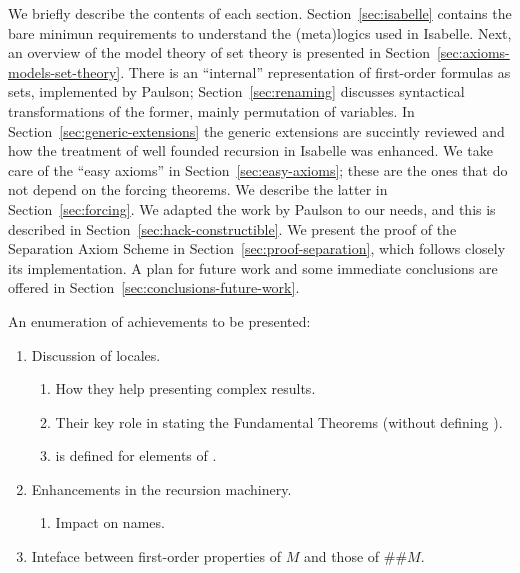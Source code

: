 We briefly describe the contents of each
section. Section~\ref{sec:isabelle} contains the bare minimun
requirements to understand the (meta)logics used in Isabelle. Next, an
overview of the model theory of set theory is presented in
Section~\ref{sec:axioms-models-set-theory}. There is an ``internal''
representation of first-order formulas as sets, implemented by
Paulson; Section~\ref{sec:renaming} discusses syntactical
transformations of the former, mainly permutation of variables. 
In Section~\ref{sec:generic-extensions} the generic extensions are
succintly reviewed and how the treatment of well founded recursion in
Isabelle was enhanced. We take care of the ``easy axioms'' in
Section~\ref{sec:easy-axioms}; these are the ones that
do not depend on the forcing theorems. We describe the latter in
Section~\ref{sec:forcing}. We adapted the  work by Paulson to our
needs, and this is described in
Section~\ref{sec:hack-constructible}. We present the proof
of the Separation Axiom Scheme in Section~\ref{sec:proof-separation},
which follows closely its implementation. A plan for future work and
some immediate conclusions are offered in
Section~\ref{sec:conclusions-future-work}.


An enumeration of achievements to be presented:
\begin{enumerate}
\item Discussion of locales.
  \begin{enumerate}
  \item How they help presenting complex results.
  \item Their key role in stating the Fundamental Theorems (without
    defining ).
  \item {} is defined for elements of \formula.
  \end{enumerate}
\item Enhancements in the recursion machinery.
  \begin{enumerate}
  \item Impact on names.
  \end{enumerate}
\item Inteface between first-order properties of $M$ and those of
  $\#\#M$.
\end{enumerate}


